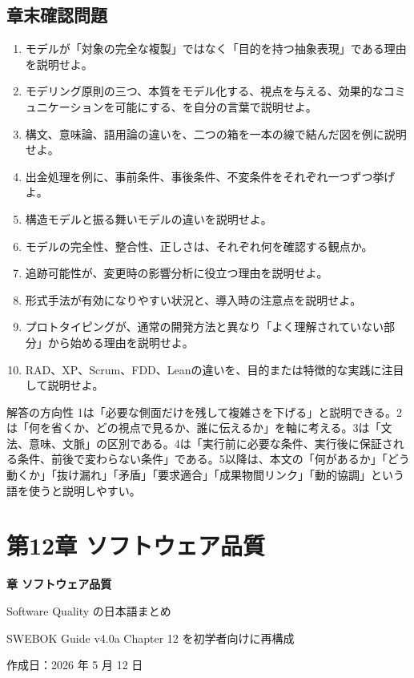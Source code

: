\documentclass[a4paper,11pt]{ltjsarticle}
\numberwithin{figure}{section}
\numberwithin{table}{section}
\begin{document}
\subsection{章末確認問題}
\begin{enumerate}
  \item モデルが「対象の完全な複製」ではなく「目的を持つ抽象表現」である理由を説明せよ。
  \item モデリング原則の三つ、本質をモデル化する、視点を与える、効果的なコミュニケーションを可能にする、を自分の言葉で説明せよ。
  \item 構文、意味論、語用論の違いを、二つの箱を一本の線で結んだ図を例に説明せよ。
  \item 出金処理を例に、事前条件、事後条件、不変条件をそれぞれ一つずつ挙げよ。
  \item 構造モデルと振る舞いモデルの違いを説明せよ。
  \item モデルの完全性、整合性、正しさは、それぞれ何を確認する観点か。
  \item 追跡可能性が、変更時の影響分析に役立つ理由を説明せよ。
  \item 形式手法が有効になりやすい状況と、導入時の注意点を説明せよ。
  \item プロトタイピングが、通常の開発方法と異なり「よく理解されていない部分」から始める理由を説明せよ。
  \item RAD、XP、Scrum、FDD、Leanの違いを、目的または特徴的な実践に注目して説明せよ。
\end{enumerate}

\begin{pointbox}{解答の方向性}
1は「必要な側面だけを残して複雑さを下げる」と説明できる。2は「何を省くか、どの視点で見るか、誰に伝えるか」を軸に考える。3は「文法、意味、文脈」の区別である。4は「実行前に必要な条件、実行後に保証される条件、前後で変わらない条件」である。5以降は、本文の「何があるか」「どう動くか」「抜け漏れ」「矛盾」「要求適合」「成果物間リンク」「動的協調」という語を使うと説明しやすい。
\end{pointbox}

\section{第12章 ソフトウェア品質}
{\Huge\bfseries{} 章 ソフトウェア品質\par}
{\Large Software Quality の日本語まとめ\par}
{\normalsize SWEBOK Guide v4.0a Chapter 12 を初学者向けに再構成\par}
{\normalsize 作成日：2026 年 5 月 12 日\par}
\end{document}
